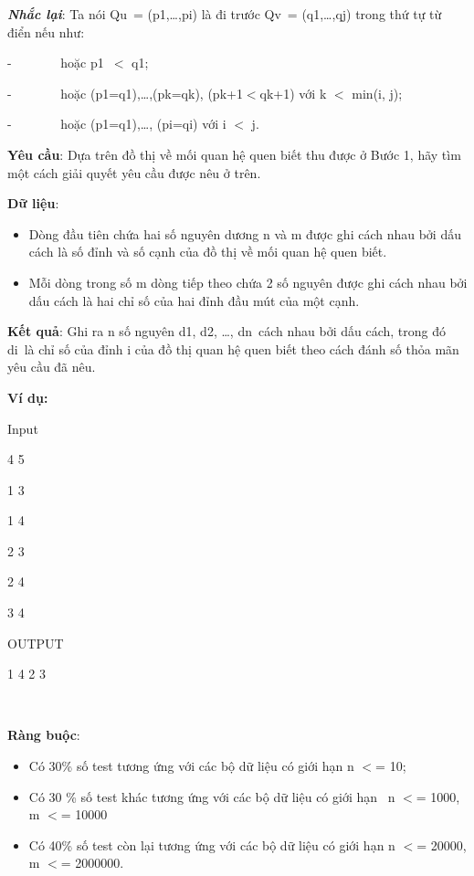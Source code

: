 \textbf{\emph{Nhắc lại}}: Ta nói Qu = (p1,…,pi) là đi trước Qv = (q1,…,qj) trong thứ tự từ điển nếu như:

-        hoặc p1 $<$ q1;

-        hoặc (p1=q1),…,(pk=qk), (pk+1$<$qk+1) với k $<$ min(i, j);

-        hoặc (p1=q1),…, (pi=qi) với i $<$ j.

\textbf{Yêu cầu}: Dựa trên đồ thị về mối quan hệ quen biết thu được ở Bước 1, hãy tìm một cách giải quyết yêu cầu được nêu ở trên.

\textbf{Dữ liệu}:
\begin{itemize}
	\item Dòng đầu tiên chứa hai số nguyên dương n và m được ghi cách nhau bởi dấu cách là số đỉnh và số cạnh của đồ thị về mối quan hệ quen biết.
	\item Mỗi dòng trong số m dòng tiếp theo chứa 2 số nguyên được ghi cách nhau bởi dấu cách là hai chỉ số của hai đỉnh đầu mút của một cạnh.
\end{itemize}

\textbf{Kết quả}: Ghi ra n số nguyên d1, d2, …, dn cách nhau bởi dấu cách, trong đó di là chỉ số của đỉnh i của đồ thị quan hệ quen biết theo cách đánh số thỏa mãn yêu cầu đã nêu.

\textbf{Ví dụ:}

Input

4 5

1 3

1 4

2 3

2 4

3 4

OUTPUT

1 4 2 3

 

\textbf{Ràng buộc}:
\begin{itemize}
	\item Có 30\% số test tương ứng với các bộ dữ liệu có giới hạn n $<$= 10;
	\item Có 30 \% số test khác tương ứng với các bộ dữ liệu có giới hạn  n $<$= 1000, m $<$= 10000
	\item Có 40\% số test còn lại tương ứng với các bộ dữ liệu có giới hạn n $<$= 20000, m $<$= 2000000.
\end{itemize}

 